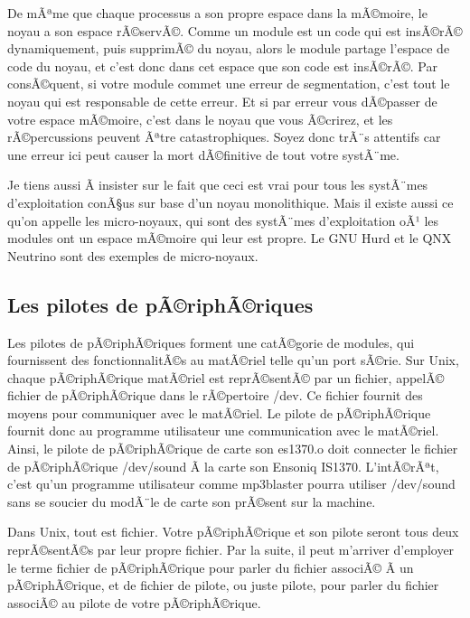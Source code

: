 \documentclass[11pt]{article}
\begin{document}
De mÃªme que chaque processus a son propre espace dans la mÃ©moire, le noyau a son espace rÃ©servÃ©. Comme un module est un code qui est insÃ©rÃ© dynamiquement, puis supprimÃ© du noyau, alors le module partage l'espace de code du noyau, et c'est donc dans cet espace que son code est insÃ©rÃ©. Par consÃ©quent, si votre module commet une erreur de segmentation, c'est tout le noyau qui est responsable de cette erreur. Et si par erreur vous dÃ©passer de votre espace mÃ©moire, c'est dans le noyau que vous Ã©crirez, et les rÃ©percussions peuvent Ãªtre catastrophiques. Soyez donc trÃ¨s attentifs car une erreur ici peut causer la mort dÃ©finitive de tout votre systÃ¨me.

Je tiens aussi Ã  insister sur le fait que ceci est vrai pour tous les systÃ¨mes d'exploitation conÃ§us sur base d'un noyau monolithique. Mais il existe aussi ce qu'on appelle les micro-noyaux, qui sont des systÃ¨mes d'exploitation oÃ¹ les modules ont un espace mÃ©moire qui leur est propre. Le GNU Hurd et le QNX Neutrino sont des exemples de micro-noyaux.

\subsection*{Les pilotes de pÃ©riphÃ©riques}
\label{sec-5-6}

Les pilotes de pÃ©riphÃ©riques forment une catÃ©gorie de modules, qui fournissent des fonctionnalitÃ©s au matÃ©riel telle qu'un port sÃ©rie. Sur Unix, chaque pÃ©riphÃ©rique matÃ©riel est reprÃ©sentÃ© par un fichier, appelÃ© fichier de pÃ©riphÃ©rique dans le rÃ©pertoire /dev. Ce fichier fournit des moyens pour communiquer avec le matÃ©riel. Le pilote de pÃ©riphÃ©rique fournit donc au programme utilisateur une communication avec le matÃ©riel. Ainsi, le pilote de pÃ©riphÃ©rique de carte son es1370.o doit connecter le fichier de pÃ©riphÃ©rique /dev/sound Ã  la carte son Ensoniq IS1370. L'intÃ©rÃªt, c'est qu'un programme utilisateur comme mp3blaster pourra utiliser /dev/sound sans se soucier du modÃ¨le de carte son prÃ©sent sur la machine.

Dans Unix, tout est fichier. Votre pÃ©riphÃ©rique et son pilote seront tous deux reprÃ©sentÃ©s par leur propre fichier. Par la suite, il peut m'arriver d'employer le terme fichier de pÃ©riphÃ©rique pour parler du fichier associÃ© Ã  un pÃ©riphÃ©rique, et de fichier de pilote, ou juste pilote, pour parler du fichier associÃ© au pilote de votre pÃ©riphÃ©rique.
\end{document}
